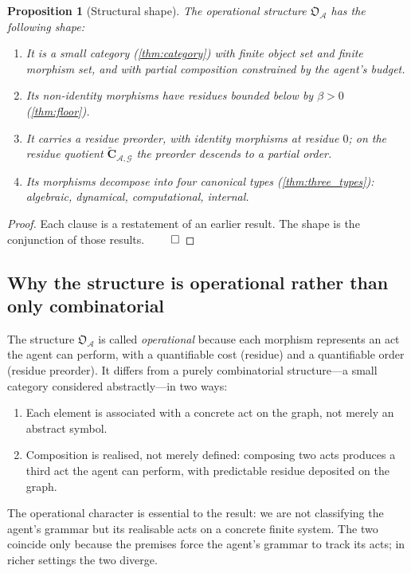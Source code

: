 \documentclass[11pt,a4paper]{article}
\theoremstyle{thmstyle}
\newtheorem{proposition}[theorem]{Proposition}
\theoremstyle{definition}
\theoremstyle{remark}
\newcommand{\Graph}{\mathcal{G}}
\newcommand{\Agent}{\mathcal{A}}
\newcommand{\floor}{\beta}
\newcommand{\OpStr}{\mathfrak{O}}
\begin{document}
\begin{proposition}[Structural shape]
\label{prop:shape}
The operational structure $\OpStr_\Agent$ has the following shape:
\begin{enumerate}[nosep,leftmargin=*]
\item It is a small category (\cref{thm:category}) with finite
object set and finite morphism set, and with partial composition
constrained by the agent's budget.
\item Its non-identity morphisms have residues bounded below by
$\floor > 0$ (\cref{thm:floor}).
\item It carries a residue preorder, with identity morphisms at
residue $0$; on the residue quotient
$\widetilde{\mathbf{C}}_{\Agent,\Graph}$ the preorder descends to a
partial order.
\item Its morphisms decompose into four canonical types
(\cref{thm:three_types}): algebraic, dynamical, computational,
internal.
\end{enumerate}
\end{proposition}

\begin{proof}
Each clause is a restatement of an earlier result. The shape is
the conjunction of those results. $\qed$
\end{proof}

\subsection{Why the structure is operational rather than only
combinatorial}

The structure $\OpStr_\Agent$ is called \emph{operational} because
each morphism represents an act the agent can perform, with a
quantifiable cost (residue) and a quantifiable order (residue
preorder). It differs from a purely combinatorial structure---a
small category considered abstractly---in two ways:
\begin{enumerate}[nosep,leftmargin=*]
\item Each element is associated with a concrete act on the graph,
not merely an abstract symbol.
\item Composition is realised, not merely defined: composing two
acts produces a third act the agent can perform, with predictable
residue deposited on the graph.
\end{enumerate}
The operational character is essential to the result: we are not
classifying the agent's grammar but its realisable acts on a
concrete finite system. The two coincide only because the premises
force the agent's grammar to track its acts; in richer settings
the two diverge.
\end{document}
